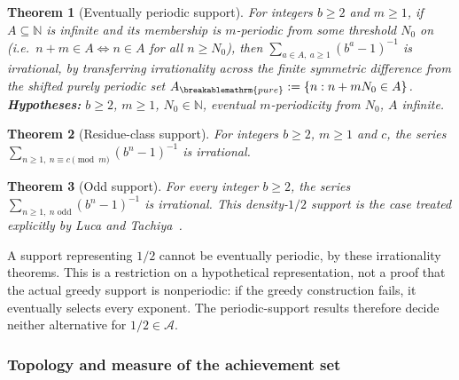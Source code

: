 \documentclass[11pt]{article}
\theoremstyle{plain}
\newtheorem{thm}{Theorem}[section]
\theoremstyle{definition}
\theoremstyle{remark}
\renewcommand{\mathrm}[1]{\ifmmode\breakablemathrm{#1}\else\textrm{#1}\fi}%
\begin{document}
\begin{thm}[Eventually periodic support]\label{thm:eventually-periodic-support}
For integers $b\ge2$ and $m\ge1$, if $A\subseteq\mathbb N$ is infinite and its membership is $m$-periodic from
some threshold $N_0$ on (i.e.\ $n+m \in A \Leftrightarrow n \in A$ for all $n \ge N_0$), then
$\sum_{a\in A,\ a\ge1}(b^a-1)^{-1}$ is irrational, by transferring irrationality across the finite
symmetric difference from the shifted purely periodic set $A_{\mathrm{pure}} := \{n : n + m N_0 \in
A\}$. \textbf{Hypotheses:} $b \ge 2$, $m \ge 1$, $N_0 \in \mathbb{N}$, eventual $m$-periodicity from
$N_0$, $A$ infinite.
\end{thm}

\begin{thm}[Residue-class support]\label{thm:residue-class-support}
For integers $b\ge2$, $m\ge1$ and $c$, the series
$\sum_{n\ge1,\ n\equiv c\pmod m}(b^n-1)^{-1}$ is irrational.
\end{thm}

\begin{thm}[Odd support]\label{thm:odd-support}
For every integer $b\ge2$, the series
$\sum_{n\ge1,\ n\text{ odd}}(b^n-1)^{-1}$ is irrational. This density-$1/2$ support is
the case treated explicitly by Luca and Tachiya~\cite[Example~2, p.~140]{lucatachiya2017}.
\end{thm}

A support representing $1/2$ cannot be eventually periodic, by these
irrationality theorems.  This is a restriction on a hypothetical
representation, not a proof that the actual greedy support is nonperiodic:
if the greedy construction fails, it eventually selects every exponent.
The periodic-support results therefore decide neither alternative for
$1/2\in\mathcal A$.

\subsubsection{Topology and measure of the achievement set}
\end{document}
